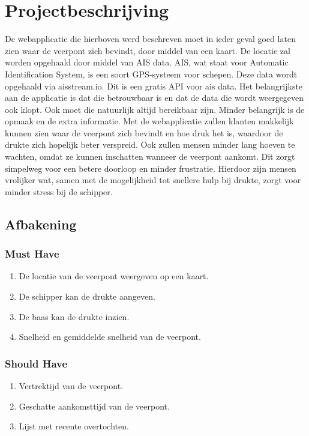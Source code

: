 \documentclass{article}
\begin{document}
\section{Projectbeschrijving}
De webapplicatie die hierboven werd beschreven moet in ieder geval goed laten zien waar de veerpont zich bevindt, door middel van een kaart. De locatie zal worden opgehaald door middel van AIS data. AIS, wat staat voor Automatic Identification System, is een soort GPS-systeem voor schepen. Deze data wordt opgehaald via aisstream.io. Dit is een gratis API voor ais data.
Het belangrijkste aan de applicatie is dat die betrouwbaar is en dat de data die wordt weergegeven ook klopt. Ook moet die natuurlijk altijd bereikbaar zijn. Minder belangrijk is de opmaak en de extra informatie. 
Met de webapplicatie zullen klanten makkelijk kunnen zien waar de veerpont zich bevindt en hoe druk het is, waardoor de drukte zich hopelijk beter verspreid. Ook zullen mensen minder lang hoeven te wachten, omdat ze kunnen inschatten wanneer de veerpont aankomt.
Dit zorgt simpelweg voor een betere doorloop en minder frustratie. Hierdoor zijn mensen vrolijker wat, samen met de mogelijkheid tot snellere hulp bij drukte, zorgt voor minder stress bij de schipper.


\subsection{Afbakening}
\subsubsection{Must Have}
\begin{enumerate}
    \item De locatie van de veerpont weergeven op een kaart.
    \item De schipper kan de drukte aangeven.
    \item De baas kan de drukte inzien.
    \item Snelheid en gemiddelde snelheid van de veerpont.
\end{enumerate}
\subsubsection{Should Have}
\begin{enumerate}
    \item Vertrektijd van de veerpont.
    \item Geschatte aankomsttijd van de veerpont.
    \item Lijst met recente overtochten.
\end{enumerate}
\end{document}

